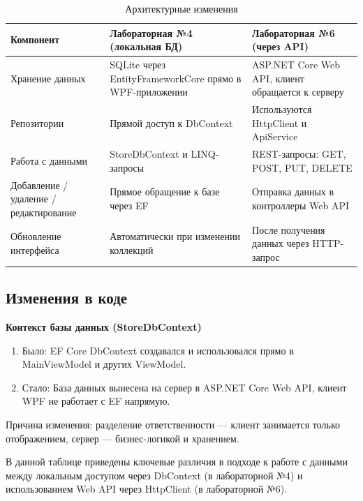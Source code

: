 \documentclass[12pt]{article}
\numberwithin{listing}{section}
\numberwithin{figure}{section}
\begin{document}
\begin{table}[H]
	\centering
	\small
	\begin{tabularx}{\linewidth}{p{4.2cm}|>{\centering\arraybackslash}X|>{\centering\arraybackslash}X}
		\toprule
		\textbf{Компонент}                     & \textbf{Лабораторная №4 (локальная БД)}                     & \textbf{Лабораторная №6 (через API)}              \\
		\midrule
		Хранение данных                        & SQLite через Entity\-Framework\-Core прямо в WPF-приложении & ASP.NET Core Web API, клиент обращается к серверу \\
		Репозитории                            & Прямой доступ к DbContext                                   & Используются Http\-Client и Api\-Service          \\
		Работа с данными                       & StoreDbContext и LI\-NQ-запросы                             & REST-запросы: GET, POST, PUT, DELETE              \\
		Добавление / удаление / редактирование & Прямое обращение к базе через EF                            & Отправка данных в контроллеры Web API             \\
		Обновление интерфейса                  & Автоматически при изменении коллекций                       & После получения данных через HTTP-запрос          \\
		\bottomrule
	\end{tabularx}
	\caption{Архитектурные изменения}
\end{table}


\subsection{Изменения в коде}
\textbf{Контекст базы данных (StoreDbContext)}
\begin{enumerate}
	\item Было: EF Core DbContext создавался и использовался прямо в MainViewModel и других ViewModel.
	\item Стало: База данных вынесена на сервер в ASP.NET Core Web API, клиент WPF не работает с EF напрямую.
\end{enumerate}
Причина изменения: разделение ответственности — клиент занимается только отображением, сервер — бизнес-логикой и хранением.

\noindent В данной таблице приведены ключевые различия в подходе к работе с данными между локальным доступом через DbContext (в лабораторной №4) и использованием Web API через HttpClient (в лабораторной №6).
\end{document}
